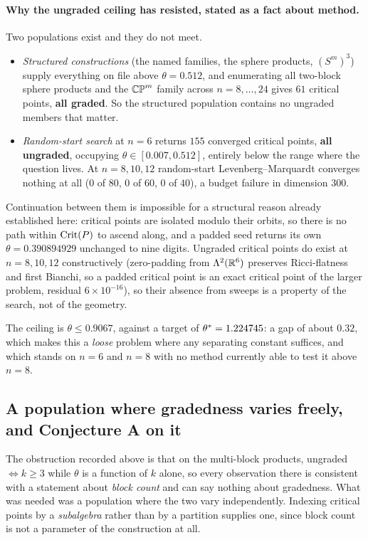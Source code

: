 \paragraph{Why the ungraded ceiling has resisted, stated as a fact about method.} Two populations exist and they do not meet.
\begin{itemize}[nosep,leftmargin=1.4em]
\item \emph{Structured constructions} (the named families, the sphere products, $(S^m)^3$) supply everything on file above $\theta=0.512$, and enumerating all two-block sphere products and the $\mathbb{CP}^m$ family across $n=8,\dots,24$ gives $61$ critical points, \textbf{all graded}. So the structured population contains no ungraded members that matter.
\item \emph{Random-start search} at $n=6$ returns $155$ converged critical points, \textbf{all ungraded}, occupying $\theta\in[0.007,0.512]$, entirely below the range where the question lives. At $n=8,10,12$ random-start Levenberg--Marquardt converges nothing at all ($0$ of $80$, $0$ of $60$, $0$ of $40$), a budget failure in dimension $300$.
\end{itemize}
Continuation between them is impossible for a structural reason already established here: critical points are isolated modulo their orbits, so there is no path within $\mathrm{Crit}(P)$ to ascend along, and a padded seed returns its own $\theta=0.390894929$ unchanged to nine digits. Ungraded critical points do exist at $n=8,10,12$ constructively (zero-padding from $\Lambda^2(\mathbb{R}^6)$ preserves Ricci-flatness and first Bianchi, so a padded critical point is an exact critical point of the larger problem, residual $6\times10^{-16}$), so their absence from sweeps is a property of the search, not of the geometry.

The ceiling is $\theta\le0.9067$, against a target of $\theta^{*}=1.224745$: a gap of about $0.32$, which makes this a \emph{loose} problem where any separating constant suffices, and which stands on $n=6$ and $n=8$ with no method currently able to test it above $n=8$.

\subsection{A population where gradedness varies freely, and Conjecture A on it}\label{sec:subalgebra}

The obstruction recorded above is that on the multi-block products, ungraded $\iff k\ge3$ while $\theta$ is a function of $k$ alone, so every observation there is consistent with a statement about \emph{block count} and can say nothing about gradedness. What was needed was a population where the two vary independently. Indexing critical points by a \emph{subalgebra} rather than by a partition supplies one, since block count is not a parameter of the construction at all.

